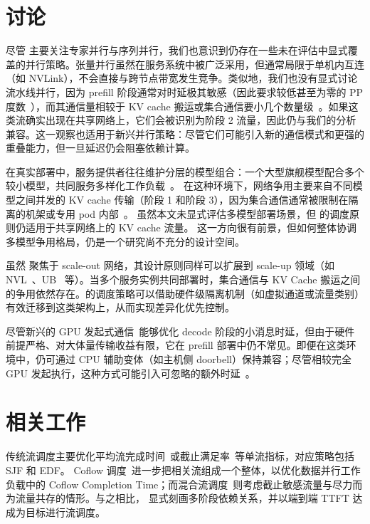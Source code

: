 \section{讨论}

 尽管 \sys 主要关注专家并行与序列并行，我们也意识到仍存在一些未在评估中显式覆盖的并行策略。张量并行虽然在服务系统中被广泛采用，但通常局限于单机内互连（如 NVLink），不会直接与跨节点带宽发生竞争。类似地，我们也没有显式讨论流水线并行，因为 prefill 阶段通常对时延极其敏感（因此要求较低甚至为零的 PP 度数~\cite{distserve}），而其通信量相较于 KV cache 搬运或集合通信要小几个数量级~\cite{liao2025mixnet}。如果这类流确实出现在共享网络上，它们会被识别为阶段 2 流量，因此仍与我们的分析兼容。这一观察也适用于新兴并行策略：尽管它们可能引入新的通信模式和更强的重叠能力，但一旦延迟仍会阻塞依赖计算。

在真实部署中，服务提供者往往维护分层的模型组合：一个大型旗舰模型配合多个较小模型，共同服务多样化工作负载~\cite{openai2024gpt4}。
在这种环境下，网络争用主要来自不同模型之间并发的 KV cache 传输（阶段 1 和阶段 3），因为集合通信通常被限制在隔离的机架或专用 pod 内部~\cite{deepseektech}。
虽然本文未显式评估多模型部署场景，但 \sys{} 的调度原则仍适用于共享网络上的 KV cache 流量。
这一方向很有前景，但如何整体协调多模型争用格局，仍是一个研究尚不充分的设计空间。

 虽然 \sys 聚焦于 scale-out 网络，其设计原则同样可以扩展到 scale-up 领域（如 NVL~\cite{nvidia_gb200_nvl72}、UB~\cite{huawei384} 等）。当多个服务实例共同部署时，集合通信与 KV Cache 搬运之间的争用依然存在。\sys 的调度策略可以借助硬件级隔离机制（如虚拟通道或流量类别）有效迁移到这类架构上，从而实现差异化优先控制。

 尽管新兴的 GPU 发起式通信~\cite{nvidia_nvshmem_ibgda,deepseek_deepep_2024}能够优化 decode 阶段的小消息时延，但由于硬件前提严格、对大体量传输收益有限，它在 prefill 部署中仍不常见。即便在这类环境中，\sys 仍可通过 CPU 辅助变体（如主机侧 doorbell）保持兼容；尽管相较完全 GPU 发起执行，这种方式可能引入可忽略的额外时延~\cite{nvidia_magnum_nvshmem3}。

\section{相关工作}

传统流调度主要优化平均流完成时间~\cite{dctcp,dcqcn,pfabric,PDQ,pias,li2017rate,li2024flow}或截止满足率~\cite{D3,d2tcp,PDQ,zhang2015guaranteeing}等单流指标，对应策略包括 SJF 和 EDF。
Coflow 调度~\cite{varys,Aalo,zhang2016coda,zhao2015rapier,susanto2016stream,agarwal2018sincronia,wan2025coflow}进一步把相关流组成一个整体，以优化数据并行工作负载中的 Coflow Completion Time；而混合流调度~\cite{karuna}则考虑截止敏感流量与尽力而为流量共存的情形。与之相比，\sys{} 显式刻画多阶段依赖关系，并以端到端 TTFT 达成为目标进行流调度。

